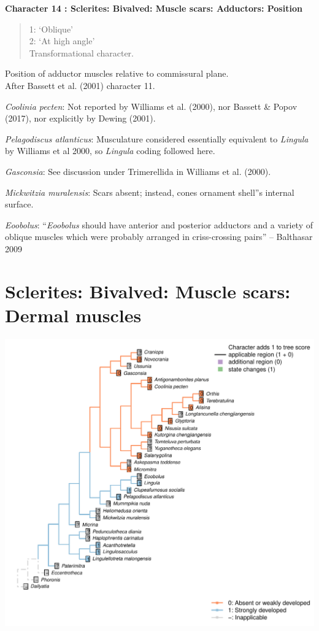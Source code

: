 \documentclass[]{book}
\theoremstyle{definition}
\theoremstyle{definition}
\theoremstyle{definition}
\theoremstyle{remark}
\begin{document}
\textbf{Character 14 : Sclerites: Bivalved: Muscle scars: Adductors:
Position }

\begin{quote}
1: `Oblique'\\
2: `At high angle'\\
Transformational character.
\end{quote}

Position of adductor muscles relative to commissural plane.\\
After Bassett et al. (2001) character 11.

\emph{Coolinia pecten}: Not reported by Williams et al. (2000), nor
Bassett \& Popov (2017), nor explicitly by Dewing (2001).

\emph{Pelagodiscus atlanticus}: Musculature considered essentially
equivalent to \emph{Lingula} by Williams et al 2000, so \emph{Lingula}
coding followed here.

\emph{Gasconsia}: See discussion under Trimerellida in Williams et al.
(2000).

\emph{Mickwitzia muralensis}: Scars absent; instead, cones ornament
shell''s internal surface.

\emph{Eoobolus}: ``\emph{Eoobolus} should have anterior and posterior
adductors and a variety of oblique muscles which were probably arranged
in criss-crossing pairs'' -- Balthasar 2009

\hypertarget{sclerites-bivalved-muscle-scars-dermal-muscles}{%
\section*{Sclerites: Bivalved: Muscle scars: Dermal
muscles}\label{sclerites-bivalved-muscle-scars-dermal-muscles}}

\includegraphics{Brachiopod_phylogeny_files/figure-latex/unnamed-chunk-5-15.pdf}
\end{document}
